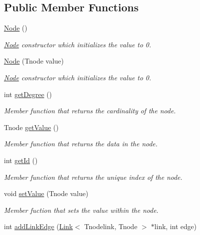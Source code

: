 \subsection*{Public Member Functions}
\begin{DoxyCompactItemize}
\item 
\hyperlink{classNode_a93fa08e2d8c63f93e3cc9ab8202e3334}{Node} ()
\begin{DoxyCompactList}\small\item\em \hyperlink{classNode}{Node} constructor which initializes the value to 0. \end{DoxyCompactList}\item 
\hyperlink{classNode_a5e6d51ef5b0456c3fd48b8196baebea5}{Node} (Tnode value)
\begin{DoxyCompactList}\small\item\em \hyperlink{classNode}{Node} constructor which initializes the value to 0. \end{DoxyCompactList}\item 
int \hyperlink{classNode_a58fa0d9e8d2099bb0afd533d8ae55d12}{get\+Degree} ()
\begin{DoxyCompactList}\small\item\em Member function that returns the cardinality of the node. \end{DoxyCompactList}\item 
Tnode \hyperlink{classNode_aa9067e2137ecc75ddd802d5a574612f1}{get\+Value} ()
\begin{DoxyCompactList}\small\item\em Member function that returns the data in the node. \end{DoxyCompactList}\item 
int \hyperlink{classNode_a91639d810acda39b666715b07b5c2100}{get\+Id} ()
\begin{DoxyCompactList}\small\item\em Member function that returns the unique index of the node. \end{DoxyCompactList}\item 
void \hyperlink{classNode_a39ea9f0c2d3af467734b5c78a001bbcb}{set\+Value} (Tnode value)
\begin{DoxyCompactList}\small\item\em Member fuction that sets the value within the node. \end{DoxyCompactList}\item 
\hypertarget{classNode_a669f230accdef7328ef0c217c63b0dd4}{int \hyperlink{classNode_a669f230accdef7328ef0c217c63b0dd4}{add\+Link\+Edge} (\hyperlink{classLink}{Link}$<$ Tnodelink, Tnode $>$ $\ast$link, int edge)}\label{classNode_a669f230accdef7328ef0c217c63b0dd4}


\end{DoxyCompactItemize}
